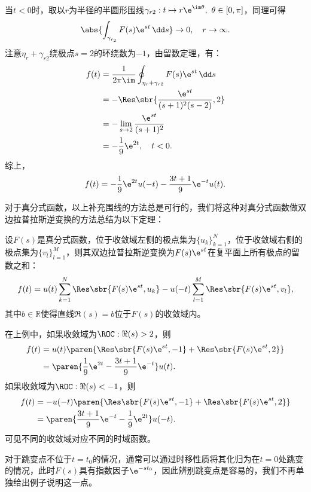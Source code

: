 \begin{example}
    当$t<0$时，取以$r$为半径的半圆形围线$\gamma_{r2}:t\mapsto r\e^{\im\theta},\ \theta\in[0,\pi]$，同理可得
    \begin{equation}
        \abs{\int_{\gamma_{r_2}}F(s)\e^{st}\,\dd s}\to 0,\quad r\to\infty.
    \end{equation}
    注意$\eta_r+\gamma_{r2}$绕极点$s=2$的环绕数为$-1$，由留数定理，有：
    \begin{align}
        f(t)&=\frac{1}{2\pi\im}\oint_{\eta_r+\gamma_{r2}}F(s)\e^{st}\,\dd s\nonumber\\
        &=-\Res\sbr{\frac{\e^{st}}{(s+1)^2(s-2)},2}\nonumber\\
        &=-\lim_{s\to 2}\frac{\e^{st}}{(s+1)^2}\nonumber\\
        &=-\frac{1}{9}\e^{2t},\quad t<0.
    \end{align}
    综上，
    \begin{equation}
        f(t)=-\frac{1}{9}\e^{2t}u(-t)-\frac{3t+1}{9}\e^{-t}u(t).
    \end{equation}
\end{example}

对于真分式函数，以上补充围线的方法总是可行的，我们将这种对真分式函数做双边拉普拉斯逆变换的方法总结为以下定理：
\begin{theorem}
    设$F(s)$是真分式函数，位于收敛域左侧的极点集为$\{u_k\}_{k=1}^{N}$，位于收敛域右侧的极点集为$\{v_l\}_{l=1}^{M}$，则其双边拉普拉斯逆变换为$F(s)\e^{st}$在复平面上所有极点的留数之和：
    \begin{equation}
        f(t)=u(t)\sum_{k=1}^{N}\Res\sbr{F(s)\e^{st},u_k}-u(-t)\sum_{l=1}^{M}\Res\sbr{F(s)\e^{st},v_l},
    \end{equation}
    其中$b\in\mathbb{R}$使得直线$\Re(s)=b$位于$F(s)$的收敛域内。
\end{theorem}

\begin{example}
    在上例中，如果收敛域为$\ROC:\Re(s)>2$，则
    \begin{align}
        f(t)&=u(t)\paren{\Res\sbr{F(s)\e^{st},-1}+\Res\sbr{F(s)\e^{st},2}}\nonumber\\
        &=\paren{\frac{1}{9}\e^{2t}-\frac{3t+1}{9}\e^{-t}}u(t).
    \end{align}
    如果收敛域为$\ROC:\Re(s)<-1$，则
    \begin{align}
        f(t)&=-u(-t)\paren{\Res\sbr{F(s)\e^{st},-1}+\Res\sbr{F(s)\e^{st},2}}\nonumber\\
        &=\paren{\frac{3t+1}{9}\e^{-t}-\frac{1}{9}\e^{2t}}u(-t).
    \end{align}
    可见不同的收敛域对应不同的时域函数。
\end{example}

对于跳变点不位于$t=t_0$的情况，通常可以通过时移性质将其化归为在$t=0$处跳变的情况，此时$F(s)$具有指数因子$\e^{-st_0}$，因此辨别跳变点是容易的，我们不再单独给出例子说明这一点。
